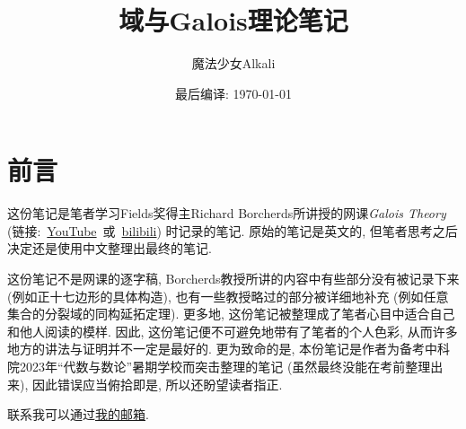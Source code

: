 \documentclass[11pt]{article}
\title{域与Galois理论笔记}
\author{魔法少女Alkali}
\date{最后编译: \today}
\theoremstyle{definition}
\theoremstyle{plain}
\theoremstyle{remark}
\begin{document}
\maketitle

\section{前言}
这份笔记是笔者学习Fields奖得主Richard Borcherds所讲授的网课\textit{Galois Theory} (链接:~\href{https://www.youtube.com/watch?v=ccc4EYeytYo}{YouTube}~或~\href{https://www.bilibili.com/video/BV1Uy4y1i7sh}{bilibili}) 时记录的笔记.
原始的笔记是英文的, 但笔者思考之后决定还是使用中文整理出最终的笔记.

这份笔记不是网课的逐字稿, Borcherds教授所讲的内容中有些部分没有被记录下来 (例如正十七边形的具体构造), 也有一些教授略过的部分被详细地补充 (例如任意集合的分裂域的同构延拓定理).
更多地, 这份笔记被整理成了笔者心目中适合自己和他人阅读的模样.
因此, 这份笔记便不可避免地带有了笔者的个人色彩, 从而许多地方的讲法与证明并不一定是最好的.
更为致命的是, 本份笔记是作者为备考中科院2023年``代数与数论''暑期学校而突击整理的笔记 (虽然最终没能在考前整理出来), 因此错误应当俯拾即是, 所以还盼望读者指正.

联系我可以通过\href{mailto:matthewzenm@icloud.com}{我的邮箱}.
\nocite{*}
\printbibliography
\end{document}
